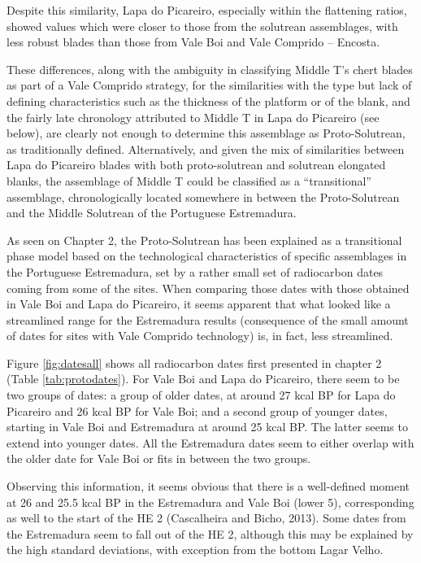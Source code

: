 \documentclass[12pt,twoside]{reedthesis}
\begin{document}
Despite this similarity, Lapa do Picareiro, especially within the flattening ratios, showed values which were closer to those from the solutrean assemblages, with less robust blades than those from Vale Boi and Vale Comprido -- Encosta.

These differences, along with the ambiguity in classifying Middle T's chert blades as part of a Vale Comprido strategy, for the similarities with the type but lack of defining characteristics such as the thickness of the platform or of the blank, and the fairly late chronology attributed to Middle T in Lapa do Picareiro (see below), are clearly not enough to determine this assemblage as Proto-Solutrean, as traditionally defined. Alternatively, and given the mix of similarities between Lapa do Picareiro blades with both proto-solutrean and solutrean elongated blanks, the assemblage of Middle T could be classified as a ``transitional'' assemblage, chronologically located somewhere in between the Proto-Solutrean and the Middle Solutrean of the Portuguese Estremadura.

As seen on Chapter 2, the Proto-Solutrean has been explained as a transitional phase model based on the technological characteristics of specific assemblages in the Portuguese Estremadura, set by a rather small set of radiocarbon dates coming from some of the sites. When comparing those dates with those obtained in Vale Boi and Lapa do Picareiro, it seems apparent that what looked like a streamlined range for the Estremadura results (consequence of the small amount of dates for sites with Vale Comprido technology) is, in fact, less streamlined.

Figure \ref{fig:datesall} shows all radiocarbon dates first presented in chapter 2 (Table \ref{tab:protodates}). For Vale Boi and Lapa do Picareiro, there seem to be two groups of dates: a group of older dates, at around 27 kcal BP for Lapa do Picareiro and 26 kcal BP for Vale Boi; and a second group of younger dates, starting in Vale Boi and Estremadura at around 25 kcal BP. The latter seems to extend into younger dates. All the Estremadura dates seem to either overlap with the older date for Vale Boi or fits in between the two groups.

Observing this information, it seems obvious that there is a well-defined moment at 26 and 25.5 kcal BP in the Estremadura and Vale Boi (lower 5), corresponding as well to the start of the HE 2 (Cascalheira and Bicho, 2013). Some dates from the Estremadura seem to fall out of the HE 2, although this may be explained by the high standard deviations, with exception from the bottom Lagar Velho.
\end{document}
